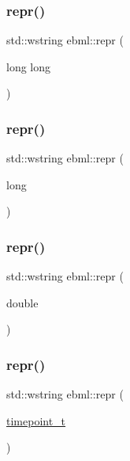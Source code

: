 \mbox{\label{namespaceebml_ae628d127f38ecd31687f54becab12c27}} 
\subsubsection{\texorpdfstring{repr()}{repr()}\hspace{0.1cm}{\footnotesize\ttfamily [7/10]}}
{\footnotesize\ttfamily std\+::wstring ebml\+::repr (\begin{DoxyParamCaption}\item[{long}]{long }\end{DoxyParamCaption})}

\mbox{\label{namespaceebml_ace4ca5a87203afac26054d724b9be07d}} 
\subsubsection{\texorpdfstring{repr()}{repr()}\hspace{0.1cm}{\footnotesize\ttfamily [8/10]}}
{\footnotesize\ttfamily std\+::wstring ebml\+::repr (\begin{DoxyParamCaption}\item[{long}]{ }\end{DoxyParamCaption})}

\mbox{\label{namespaceebml_a2798ab93b716158ab4c4e796f7c9c97c}} 
\subsubsection{\texorpdfstring{repr()}{repr()}\hspace{0.1cm}{\footnotesize\ttfamily [9/10]}}
{\footnotesize\ttfamily std\+::wstring ebml\+::repr (\begin{DoxyParamCaption}\item[{double}]{ }\end{DoxyParamCaption})}

\mbox{\label{namespaceebml_a92c6b0cf4a3eef6a4b48746c0e43a3c1}} 
\subsubsection{\texorpdfstring{repr()}{repr()}\hspace{0.1cm}{\footnotesize\ttfamily [10/10]}}
{\footnotesize\ttfamily std\+::wstring ebml\+::repr (\begin{DoxyParamCaption}\item[{\mbox{\hyperlink{namespaceebml_a7e667ec3fe8b51fb5b8f9690734d8638}{timepoint\+\_\+t}}}]{ }\end{DoxyParamCaption})}

